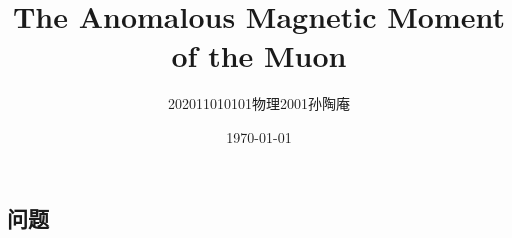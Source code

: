\documentclass[12pt, a4paper, oneside]{ctexart}
\title{The Anomalous Magnetic Moment of the Muon}
\date{\today}
\author{202011010101物理2001孙陶庵}
\begin{document}
\begin{spacing}{2.0}
\tableofcontents
\maketitle

\section{问题}




\end{spacing}{}
\end{document}
